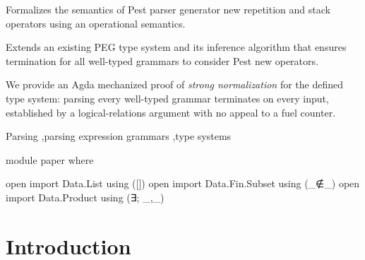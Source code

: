 \documentclass[preprint,12pt]{elsarticle}
\theoremstyle{definition}
\begin{document}
\begin{frontmatter}

\begin{highlights}
\item Formalizes the semantics of Pest parser generator new repetition and stack operators
  using an operational semantics.
\item Extends an existing PEG type system and its inference algorithm that ensures
  termination for all well-typed grammars to consider Pest new operators.
\item We provide an Agda mechanized proof of \emph{strong normalization} for the defined type
  system: parsing every well-typed grammar terminates on every input, established by a
  logical-relations argument with no appeal to a fuel counter.
\end{highlights}

\begin{keyword}
Parsing \sep parsing expression grammars \sep type systems
\end{keyword}

\end{frontmatter}



\begin{code}[hide]
module paper where

open import Data.List using ([])
open import Data.Fin.Subset using (_∉_)
open import Data.Product using (∃; _,_)
\end{code}

\section{Introduction}\label{sec:intro}
\end{document}
